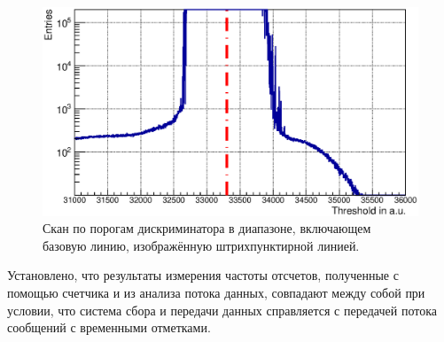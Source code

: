 

\begin{figure}[H]
\includegraphics[width=1.0\textwidth]{pictures/31_cMean12.eps}
\caption{Скан по порогам дискриминатора в диапазоне, включающем базовую линию, изображённую штрихпунктирной линией.}
\label{fig:TDCscalerScan}
\end{figure}

Установлено, что результаты измерения частоты отсчетов, полученные с помощью счетчика и из анализа потока данных, совпадают между собой при условии, что система сбора и передачи данных справляется с передачей потока сообщений с временными отметками.

